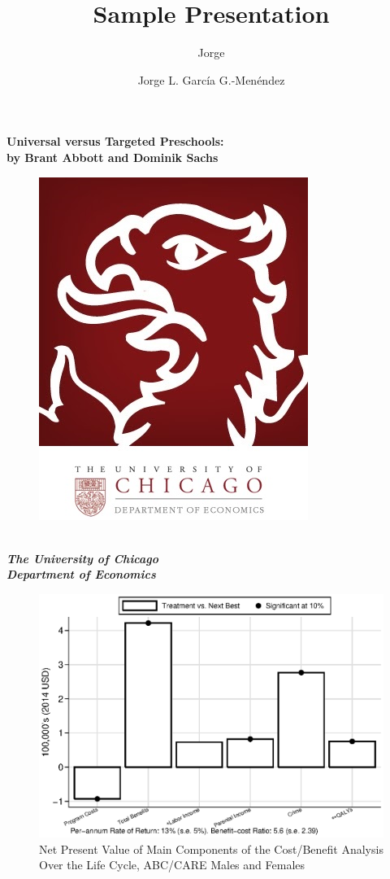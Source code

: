 

\title{Sample Presentation}
\subtitle{Jorge}
\author{Jorge L. Garc\'{i}a G.-Men\'{e}ndez}



\begin{frame}[plain]
\begin{center}
	\textbf{Universal versus Targeted Preschools: \\
	by Brant Abbott and Dominik Sachs}

\begin{center}
\begin{figure}[H] 
\label{figure:initial}
\centering
\includegraphics[width=.2\columnwidth]{uchicago.png}
\end{figure}
\end{center}
	\textbf \textit{{\footnotesize \\ The University of Chicago \\ Department of Economics}}	
\end{center}
\end{frame}


\begin{frame}[plain]
	\begin{center}
\begin{figure}[H] 
\caption{Net Present Value of Main Components of the Cost/Benefit Analysis Over the Life Cycle, ABC/CARE Males and Females}
\label{figure:youlabel}
\centering
\includegraphics[width=.9\columnwidth]{output/abccare_npvssumm.eps}
\end{figure}
\end{center}
\end{frame}

